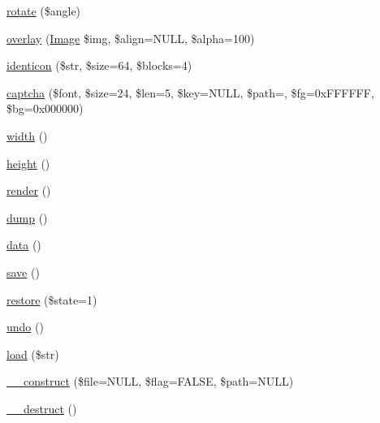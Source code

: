 \begin{DoxyCompactItemize}
\item 
\hyperlink{class_image_a4295061e879c4cc714213bf14116d346}{rotate} (\$angle)
\item 
\hyperlink{class_image_a8a9ac897190d669360d49849f2fedd4b}{overlay} (\hyperlink{class_image}{Image} \$img, \$align=N\+U\+LL, \$alpha=100)
\item 
\hyperlink{class_image_a21a211586a8f97991d047e17b1b886e2}{identicon} (\$str, \$size=64, \$blocks=4)
\item 
\hyperlink{class_image_a4a77a76c9efebb84729d655f56d405d1}{captcha} (\$font, \$size=24, \$len=5, \$key=N\+U\+LL, \$path=\textquotesingle{}\textquotesingle{}, \$fg=0x\+F\+F\+F\+F\+F\+F, \$bg=0x000000)
\item 
\hyperlink{class_image_aac6ce1a0981556eb27334db76b666350}{width} ()
\item 
\hyperlink{class_image_a40c074d7d21447265a9ce46470c94414}{height} ()
\item 
\hyperlink{class_image_afde88292c44dc59faf017738dae6dffb}{render} ()
\item 
\hyperlink{class_image_a5bf63e4ac70cfd9d97e3f2eab936ec8b}{dump} ()
\item 
\hyperlink{class_image_a742e8fae78fd74219638525de1271605}{data} ()
\item 
\hyperlink{class_image_afc8a3c62679cf00ade9f15fb2a6d6132}{save} ()
\item 
\hyperlink{class_image_a6c2fdbe1df4f3168e741037c8be1a7c0}{restore} (\$state=1)
\item 
\hyperlink{class_image_a0347027efc0e46047792065615ac94eb}{undo} ()
\item 
\hyperlink{class_image_afab4d10bf39b2e1c9b00b50833b7442a}{load} (\$str)
\item 
\hyperlink{class_image_a57aaf05740138a0cc4719034d5b066ce}{\+\_\+\+\_\+construct} (\$file=N\+U\+LL, \$flag=F\+A\+L\+SE, \$path=N\+U\+LL)
\item 
\hyperlink{class_image_a421831a265621325e1fdd19aace0c758}{\+\_\+\+\_\+destruct} ()
\end{DoxyCompactItemize}
